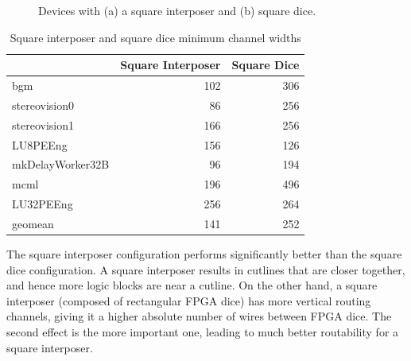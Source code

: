 \documentclass[journal]{IEEEtran}
\begin{document}
\begin{figure}[!htbp]
\centering
{}
\caption{Devices with (a) a square interposer and (b) square dice.}
\label{fig:square_tall}
\end{figure}

\begin{table}[!htbp]
\centering
\caption{Square interposer and square dice minimum channel widths}
\begin{tabular}{|l|r|r|}
\hline
 & Square Interposer & Square Dice \\ \hline \hline
bgm & 102 & 306 \\ \hline
stereovision0 & 86 & 256 \\ \hline
stereovision1 & 166 & 256 \\ \hline
LU8PEEng & 156 & 126 \\ \hline
mkDelayWorker32B & 96 & 194 \\ \hline
mcml & 196 & 496 \\ \hline
LU32PEEng & 256 & 264 \\ \hhline{|=|=|=|}
geomean & 141 & 252 \\ \hline
\end{tabular}
\label{table:squares}
\end{table}

The square interposer configuration performs significantly better than the square dice configuration. A square interposer results in cutlines that are closer together, and hence more logic blocks are near a cutline. On the other hand, a square interposer (composed of rectangular FPGA dice) has more vertical routing channels, giving it a higher absolute number of wires between FPGA dice. The second effect is the more important one, leading to much better routability for a square interposer.
\end{document}
